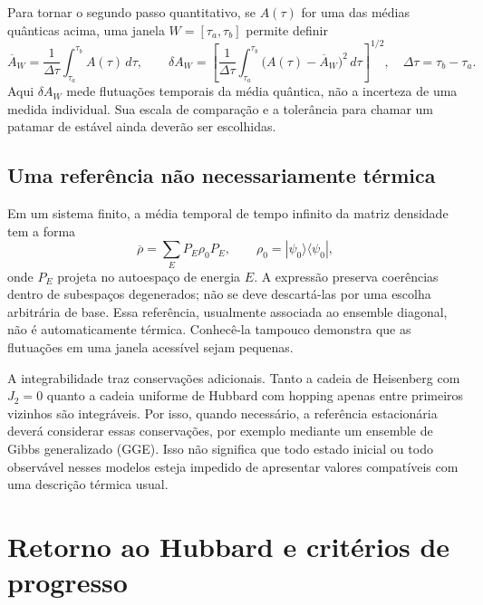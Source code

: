 \documentclass[a4paper,11pt]{article}
\begin{document}
Para tornar o segundo passo quantitativo, se $A(\tau)$ for uma das
médias quânticas acima, uma janela $W=[\tau_a,\tau_b]$ permite definir
\begin{equation}
  \overline A_W=\frac{1}{\Delta\tau}\int_{\tau_a}^{\tau_b}A(\tau)\,d\tau,
  \qquad
  \delta A_W=
  \left[\frac{1}{\Delta\tau}\int_{\tau_a}^{\tau_b}
  \bigl(A(\tau)-\overline A_W\bigr)^2\,d\tau\right]^{1/2},
  \quad \Delta\tau=\tau_b-\tau_a.
\end{equation}
Aqui $\delta A_W$ mede flutuações temporais da média quântica, não a
incerteza de uma medida individual. Sua escala de comparação e a
tolerância para chamar um patamar de estável ainda deverão ser escolhidas.

\newpage
\subsection{Uma referência não necessariamente térmica}

Em um sistema finito, a média temporal de tempo infinito da matriz
densidade tem a forma
\begin{equation}
  \overline\rho=\sum_E P_E\rho_0P_E,
  \qquad \rho_0=|\psi_0\rangle\langle\psi_0|,
  \label{eq:diagonal}
\end{equation}
onde $P_E$ projeta no autoespaço de energia $E$. A expressão preserva
coerências dentro de subespaços degenerados; não se deve descartá-las
por uma escolha arbitrária de base. Essa referência, usualmente
associada ao ensemble diagonal, não é automaticamente térmica.
Conhecê-la tampouco demonstra que as flutuações em uma janela acessível
sejam pequenas.

A integrabilidade traz conservações adicionais. Tanto a cadeia de
Heisenberg com $J_2=0$ quanto a cadeia uniforme de Hubbard com hopping
apenas entre primeiros vizinhos são integráveis. Por isso, quando
necessário, a referência estacionária deverá considerar essas
conservações, por exemplo mediante um ensemble de Gibbs generalizado
(GGE). Isso não significa que todo estado inicial ou todo observável
nesses modelos esteja impedido de apresentar valores compatíveis com
uma descrição térmica usual.

\section{Retorno ao Hubbard e critérios de progresso}
\end{document}
